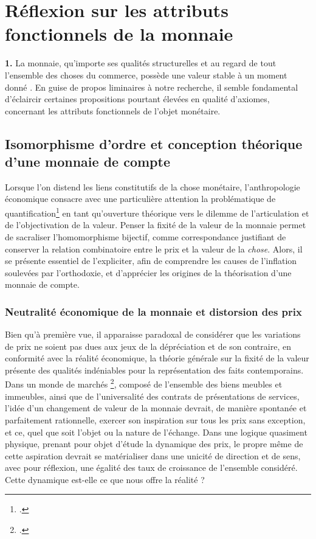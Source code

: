 {\section{Réflexion sur les attributs fonctionnels de la monnaie}

\textbf{1.} La monnaie, qu'importe ses qualités structurelles et au regard de tout l'ensemble des choses du commerce, possède une valeur stable à un moment donné \citep{mongin1887}. En guise de propos liminaires à notre recherche, il semble fondamental d'éclaircir certaines propositions pourtant élevées en qualité d'axiomes, concernant les attributs fonctionnels de l'objet monétaire.\par

\subsection{Isomorphisme d'ordre et conception théorique d'une monnaie de compte}

Lorsque l'on distend les liens constitutifs de la chose monétaire, l'anthropologie économique consacre avec une particulière attention la problématique de quantification\footnote{.} en tant qu'ouverture théorique vers le dilemme de l'articulation et de l'objectivation de la valeur. Penser la fixité de la valeur de la monnaie permet de sacraliser l'homomorphisme bijectif, comme correspondance justifiant de conserver la relation combinatoire entre le prix et la valeur de la \emph{chose}. Alors, il se présente essentiel de l'expliciter, afin de comprendre les causes de l'inflation soulevées par l'orthodoxie, et d'apprécier les origines de la théorisation d'une monnaie de compte.\par
	
\subsubsection{Neutralité économique de la monnaie et distorsion des prix}

Bien qu'à première vue, il apparaisse paradoxal de considérer que les variations de prix ne soient pas dues aux jeux de la dépréciation et de son contraire, en conformité avec la réalité économique, la théorie générale sur la fixité de la valeur présente des qualités indéniables pour la représentation des faits contemporains. Dans un monde de marchés \footnote{.}, composé de l'ensemble des biens meubles et immeubles, ainsi que de l'universalité des contrats de présentations de services, l'idée d'un changement de valeur de la monnaie devrait, de manière spontanée et parfaitement rationnelle, exercer son inspiration sur tous les prix sans exception, et ce, quel que soit l'objet ou la nature de l'échange. Dans une logique quasiment physique, prenant pour objet d'étude la dynamique des prix, le propre même de cette aspiration devrait se matérialiser dans une unicité de direction et de sens, avec pour réflexion, une égalité des taux de croissance de l'ensemble considéré. Cette dynamique est-elle ce que nous offre la réalité ?\par

}
